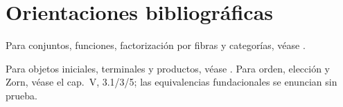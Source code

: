 \section*{Orientaciones bibliográficas}
Para conjuntos, funciones, factorización por fibras y categorías, véase \citet[cap.~I, definición 1.1, proposiciones 2.1/3, teorema 2.7 y definición 3.1]{aluffi2009}.

Para objetos iniciales, terminales y productos, véase \citet[cap.~II, 1.12--14]{aluffi2009}. Para orden, elección y Zorn, véase el cap.~V, 3.1/3/5; las equivalencias fundacionales se enuncian sin prueba.
